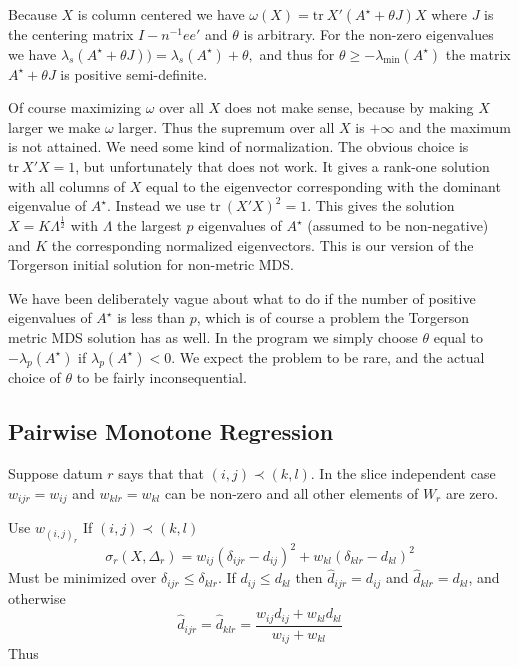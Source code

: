 \documentclass[
  12pt,
]{article}
\begin{document}
Because \(X\) is column centered we have
\(\omega(X)=\text{tr}\ X'(A^\star + \theta J)X\) where \(J\) is the
centering matrix \(I-n^{-1}ee'\) and \(\theta\) is arbitrary. For
the non-zero eigenvalues we have
\(\lambda_s(A^\star + \theta J))=\lambda_s(A^\star) + \theta,\)
and thus for \(\theta\geq-\lambda_{\text{min}}(A^\star)\) the matrix \(A^\star + \theta J\) is positive semi-definite.

Of course maximizing \(\omega\) over all \(X\) does not make sense, because
by making \(X\) larger we make \(\omega\) larger. Thus the supremum over all
\(X\) is \(+\infty\) and the maximum is not attained. We need some
kind of normalization. The obvious choice is \(\text{tr}\ X'X=1\), but
unfortunately that does not work. It gives a rank-one solution
with all columns of \(X\) equal to the eigenvector corresponding with the
dominant eigenvalue of \(A^\star\). Instead we use \(\text{tr}\ (X'X)^2=1\).
This gives the solution \(X=K\Lambda^\frac12\) with \(\Lambda\) the largest \(p\) eigenvalues of \(A^\star\) (assumed to be non-negative) and \(K\) the
corresponding normalized eigenvectors. This is our version of
the Torgerson initial solution for non-metric MDS.

We have been deliberately vague about what to do if the number of
positive eigenvalues of \(A^\star\) is less than \(p\), which is of
course a problem the Torgerson metric MDS solution has as well. In the
program we simply choose \(\theta\) equal to \(-\lambda_p(A^\star)\)
if \(\lambda_p(A^\star)<0\). We expect the problem to be rare, and
the actual choice of \(\theta\) to be fairly inconsequential.

\subsection{Pairwise Monotone Regression}\label{pairwise-monotone-regression}

Suppose datum \(r\) says that that \((i,j)\prec(k,l)\). In the slice independent case \(w_{ijr}=w_{ij}\) and \(w_{klr}=w_{kl}\)
can be non-zero and all other elements of \(W_r\) are zero.

Use \(w_{(i,j)_r}\)
If \((i,j)\prec(k,l)\)
\[
\sigma_r(X,\Delta_r)=w_{ij}(\delta_{ijr}-d_{ij})^2+w_{kl}(\delta_{klr}-d_{kl})^2
\]
Must be minimized over \(\delta_{ijr}\leq\delta_{klr}\). If \(d_{ij}\leq d_{kl}\)
then \(\hat d_{ijr}=d_{ij}\) and \(\hat d_{klr}=d_{kl}\), and otherwise
\[
\hat d_{ijr}=\hat d_{klr}=\frac{w_{ij}d_{ij}+w_{kl}d_{kl}}{w_{ij}+w_{kl}}
\]
Thus
\end{document}
